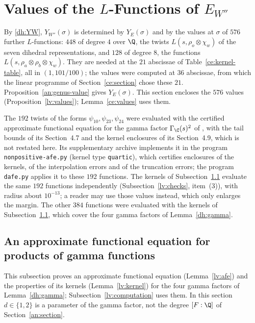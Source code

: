\section{\texorpdfstring{Values of the $L$-Functions of $E_{W''}$}{Values of the L-Functions of E\_W''}}
\label{lv:section}

By \eqref{dh:YW}, $Y_{W''}(\sigma)$ is determined by $Y_E(\sigma)$ and by the
values at $\sigma$ of $576$ further $L$-functions: $448$ of degree $4$ over
$\Q$, the twists $L(s,\rho_o\otimes\chi_w)$ of the seven dihedral
representations, and $128$ of degree $8$, the functions
$L(s,\rho_a\otimes\rho_b\otimes\chi_w)$. They are needed at the $21$
abscissae of Table~\ref{ce:kernel-table}, all in $(1,101/100)$; the values
were computed at $36$ abscissae, from which the linear programme of
Section~\ref{ce:section} chose these $21$. Proposition~\ref{an:genus-value}
gives $Y_E(\sigma)$. This section encloses the $576$ values
(Proposition~\ref{lv:values}); Lemma~\ref{ce:values} uses them.

The $192$ twists of the forms $\psi_{10},\psi_{23},\psi_{24}$ were evaluated
with the certified approximate functional equation for the gamma factor
$\Gamma_\C(s)^2$ of \cite[Section~4.6, Lemma~4.4]{Naslund0418235}, with the
tail bounds of its Section~4.7 and the kernel enclosures of its
Section~4.9, which is not restated here. Its supplementary archive
implements it in the program \texttt{nonpositive-afe.py} (kernel type
\texttt{quartic}), which certifies enclosures of the kernels, of the
interpolation errors and of the truncation errors; the program
\texttt{dafe.py} applies it to these $192$ functions. The kernels of
Subsection~\ref{lv:afe-general} evaluate the same $192$ functions
independently (Subsection~\ref{lv:checks}, item~(3)), with radius about
$10^{-13}$; a reader may use those values instead, which only enlarges the
margin. The other $384$ functions were evaluated with the kernels of
Subsection~\ref{lv:afe-general}, which cover the four gamma factors of
Lemma~\ref{dh:gamma}.

\subsection{An approximate functional equation for products of gamma
functions}\label{lv:afe-general}
This subsection proves an approximate functional equation
(Lemma~\ref{lv:afe}) and the properties of its kernels
(Lemma~\ref{lv:kernel}) for the four gamma factors of Lemma~\ref{dh:gamma};
Subsection~\ref{lv:computation} uses them. In this section $d\in\{1,2\}$ is
a parameter of the gamma factor, not the degree $[F:\Q]$ of
Section~\ref{an:section}.

